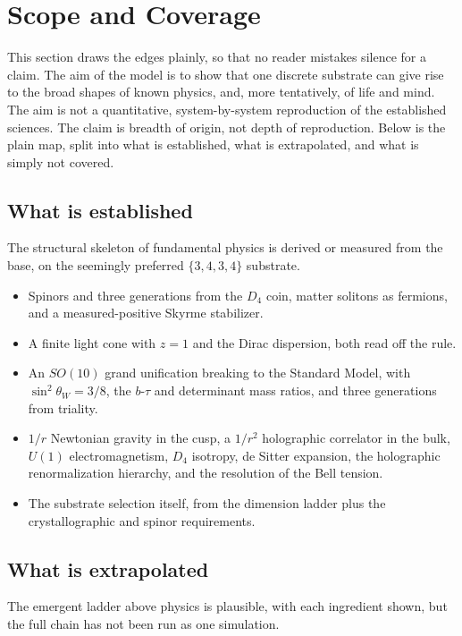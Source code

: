 \section{Scope and Coverage}

This section draws the edges plainly, so that no reader mistakes silence for a claim. The aim of the model is to show that one discrete substrate can give rise to the broad shapes of known physics, and, more tentatively, of life and mind. The aim is not a quantitative, system-by-system reproduction of the established sciences. The claim is breadth of origin, not depth of reproduction. Below is the plain map, split into what is established, what is extrapolated, and what is simply not covered.

\subsection{What is established}

The structural skeleton of fundamental physics is derived or measured from the base, on the seemingly preferred $\{3,4,3,4\}$ substrate.

\begin{itemize}
  \item Spinors and three generations from the $D_4$ coin, matter solitons as fermions, and a measured-positive Skyrme stabilizer.
  \item A finite light cone with $z = 1$ and the Dirac dispersion, both read off the rule.
  \item An $SO(10)$ grand unification breaking to the Standard Model, with $\sin^2\theta_W = 3/8$, the $b$-$\tau$ and determinant mass ratios, and three generations from triality.
  \item $1/r$ Newtonian gravity in the cusp, a $1/r^2$ holographic correlator in the bulk, $U(1)$ electromagnetism, $D_4$ isotropy, de Sitter expansion, the holographic renormalization hierarchy, and the resolution of the Bell tension.
  \item The substrate selection itself, from the dimension ladder plus the crystallographic and spinor requirements.
\end{itemize}

\subsection{What is extrapolated}

The emergent ladder above physics is plausible, with each ingredient shown, but the full chain has not been run as one simulation.

